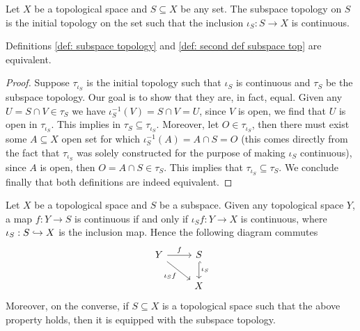 \begin{definition}
\label{def: second def subspace top}
Let \(X\) be a topological space and \(S \subseteq X\) be any set. The
subspace topology on \(S\) is the initial topology on the set such that the
inclusion \(\iota_S: S \to X\) is continuous.
\end{definition}

\begin{corollary}
Definitions \ref{def: subspace topology} and \ref{def: second def subspace
top} are equivalent.
\end{corollary}

\begin{proof}
Suppose \(\tau_{\iota_S}\) is the initial topology such that \(\iota_S\) is
continuous and \(\tau_S\) be the subspace topology. Our goal is to show that
they are, in fact, equal. Given any \(U = S \cap V \in \tau_S\) we have
\(\iota_S^{-1}(V) = S \cap V = U\), since \(V\) is open, we find that \(U\) is
open in \(\tau_{\iota_S}\). This implies in \(\tau_S \subseteq
\tau_{\iota_S}\). Moreover, let \(O \in \tau_{\iota_S}\), then there must exist
some \(A \subseteq X\) open set for which \(\iota_S^{-1}(A) = A \cap S = O\)
(this comes directly from the fact that \(\tau_{\iota_S}\) was solely
constructed for the purpose of making \(\iota_S\) continuous), since \(A\) is
open, then \(O = A \cap S \in \tau_S\). This implies that
\(\tau_{\iota_S} \subseteq \tau_{S}\). We conclude finally that both
definitions are indeed equivalent.
\end{proof}

\begin{theorem}
Let \(X\) be a topological space and \(S\) be a subspace. Given any
topological space \(Y\), a map \(f: Y \to S\) is continuous if and only if
\(\iota_S  f : Y \to X\) is continuous, where \(\iota_S: S
\hookrightarrow X\) is the inclusion map. Hence the following diagram commutes
\[
  \begin{tikzcd}
    Y \ar[r, "f"] \ar[rd, swap, "\iota_S  f"]
      &S \ar[d, hook, "\iota_S"] \\
      &X
  \end{tikzcd}
\]
Moreover, on the converse, if \(S \subseteq X\) is a topological space such
that the above property holds, then it is equipped with the subspace topology.
\end{theorem}

